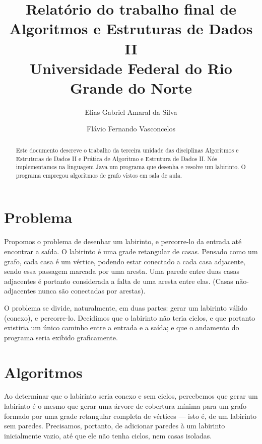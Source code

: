 \documentclass{article}
\begin{document}
\title{Relatório do trabalho final de Algoritmos e Estruturas de Dados
  II\\
  \large Universidade Federal do Rio Grande do Norte}

\author{Elias Gabriel Amaral da Silva
  \and Flávio Fernando Vasconcelos}

\maketitle

\begin{abstract}
Este documento descreve o trabalho da terceira unidade das disciplinas
Algoritmos e Estruturas de Dados II e Prática de Algoritmo e Estrutura
de Dados II. Nós implementamos na linguagem Java um programa que desenha
e resolve um labirinto. O programa empregou algoritmos de grafo vistos
em sala de aula.
\end{abstract}

\section*{Problema}

Propomos o problema de desenhar um labirinto, e percorre-lo da entrada
até encontrar a saída. O labirinto é uma grade retangular de
casas. Pensado como um grafo, cada casa é um vértice, podendo estar
conectado a cada casa adjacente, sendo essa passagem marcada por uma
aresta. Uma parede entre duas casas adjacentes é portanto considerada a
falta de uma aresta entre elas. (Casas não-adjacentes nunca são
conectadas por arestas).

O problema se divide, naturalmente, em duas partes: gerar um labirinto
válido (conexo), e percorre-lo. Decidimos que o labirinto não teria
ciclos, e que portanto existiria um único caminho entre a entrada e a
saída; e que o andamento do programa seria exibido graficamente.

\section*{Algoritmos}

Ao determinar que o labirinto seria conexo e sem ciclos, percebemos que
gerar um labirinto é o mesmo que gerar uma árvore de cobertura mínima
para um grafo formado por uma grade retangular completa de vértices ---
isto é, de um labirinto sem paredes. Precisamos, portanto, de adicionar
paredes à um labirinto inicialmente vazio, até que ele não tenha ciclos,
nem casas isoladas.
\end{document}
